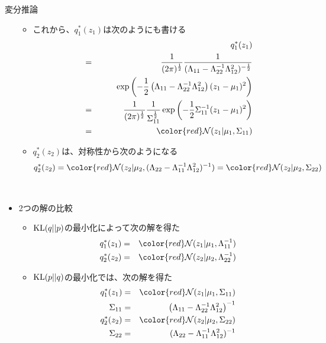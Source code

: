 \documentclass[dvipdfmx,notheorems,t]{beamer}
\begin{document}
\begin{frame}{変分推論}
\begin{itemize}
\begin{itemize}
		\item これから、$q_1^*(z_1)$は次のようにも書ける
		\begin{eqnarray}
			&& q_1^*(z_1) \nonumber \\
			&=& \frac{1}{(2\pi)^\frac{1}{2}} \frac{1}{(\Lambda_{11} - \Lambda_{22}^{-1} \Lambda_{12}^2)^{-\frac{1}{2}}} \nonumber \\
			&& \qquad \exp \left( -\frac{1}{2} \left( \Lambda_{11} - \Lambda_{22}^{-1} \Lambda_{12}^2 \right) (z_1 - \mu_1)^2 \right) \\
			&=& \frac{1}{(2\pi)^\frac{1}{2}} \frac{1}{\Sigma_{11}^\frac{1}{2}} \exp \left( -\frac{1}{2} \Sigma_{11}^{-1} (z_1 - \mu_1)^2 \right) \\
			&=& \color{red}\mathcal{N}(z_1 | \mu_1, \Sigma_{11})\normalcolor
		\end{eqnarray}
		
		\item $q_2^*(z_2)$は、対称性から次のようになる
		\begin{equation}
			q_2^*(z_2) = \color{red}\mathcal{N}(z_2 | \mu_2, (\Lambda_{22} - \Lambda_{11}^{-1} \Lambda_{12}^2)^{-1})\normalcolor = \color{red}\mathcal{N}(z_2 | \mu_2, \Sigma_{22})\normalcolor
		\end{equation}
	\end{itemize} \
	
	\item 2つの解の比較
	\begin{itemize}
		\item $\operatorname{KL}(q || p)$の最小化によって次の解を得た
		\begin{eqnarray}
			q_1^*(z_1) &=& \color{red}\mathcal{N}(z_1 | \mu_1, \Lambda_{11}^{-1})\normalcolor \\
			q_2^*(z_2) &=& \color{red}\mathcal{N}(z_2 | \mu_2, \Lambda_{22}^{-1})\normalcolor
		\end{eqnarray}
		\newline
		
		\item $\operatorname{KL}(p || q)$の最小化では、次の解を得た
		\begin{eqnarray}
			q_1^*(z_1) &=& \color{red}\mathcal{N}(z_1 | \mu_1, \Sigma_{11})\normalcolor \\
			\Sigma_{11} &=& \left( \Lambda_{11} - \Lambda_{22}^{-1} \Lambda_{12}^2 \right)^{-1} \\
			q_2^*(z_2) &=& \color{red}\mathcal{N}(z_2 | \mu_2, \Sigma_{22})\normalcolor \\
			\Sigma_{22} &=& (\Lambda_{22} - \Lambda_{11}^{-1} \Lambda_{12}^2)^{-1}
		\end{eqnarray}
		

\end{itemize}
\end{itemize}
\end{frame}
\end{document}
